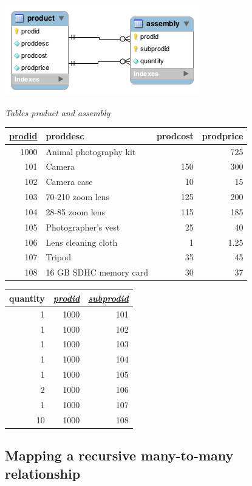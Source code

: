 \documentclass[
]{article}
\begin{document}
\includegraphics{Figures/Chapter 6/recursive-m-and-m-wb.png}

\emph{Tables product and assembly}

\begin{longtable}[]{@{}rlrr@{}}
\toprule
\underline{prodid} & proddesc & prodcost & prodprice \\
\midrule
\endhead
1000 & Animal photography kit & & 725 \\
101 & Camera & 150 & 300 \\
102 & Camera case & 10 & 15 \\
103 & 70-210 zoom lens & 125 & 200 \\
104 & 28-85 zoom lens & 115 & 185 \\
105 & Photographer's vest & 25 & 40 \\
106 & Lens cleaning cloth & 1 & 1.25 \\
107 & Tripod & 35 & 45 \\
108 & 16 GB SDHC memory card & 30 & 37 \\
\bottomrule
\end{longtable}

\begin{longtable}[]{@{}rrr@{}}
\toprule
quantity & \underline{\emph{prodid}} & \underline{\emph{subprodid}} \\
\midrule
\endhead
1 & 1000 & 101 \\
1 & 1000 & 102 \\
1 & 1000 & 103 \\
1 & 1000 & 104 \\
1 & 1000 & 105 \\
2 & 1000 & 106 \\
1 & 1000 & 107 \\
10 & 1000 & 108 \\
\bottomrule
\end{longtable}

\hypertarget{mapping-a-recursive-many-to-many-relationship}{%
\subsection*{Mapping a recursive many-to-many relationship}\label{mapping-a-recursive-many-to-many-relationship}}
\end{document}
